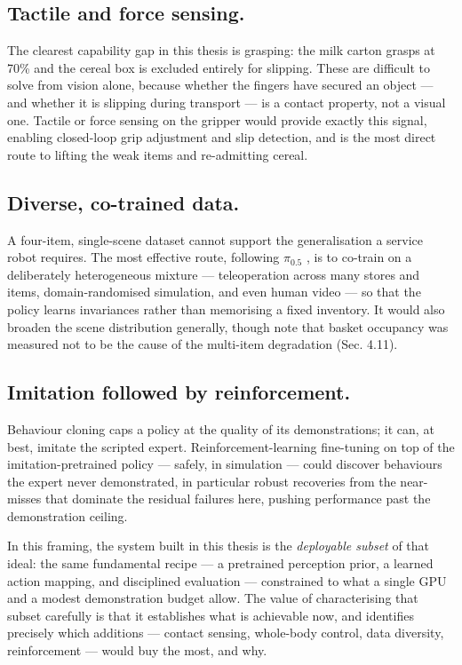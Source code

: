 \subsection{Tactile and force sensing.} The clearest capability gap in this thesis is
grasping: the milk carton grasps at 70\% and the cereal box is excluded entirely for
slipping. These are difficult to solve from vision alone, because whether the fingers
have secured an object --- and whether it is slipping during transport --- is a contact
property, not a visual one. Tactile or force sensing on the gripper would provide
exactly this signal, enabling closed-loop grip adjustment and slip detection, and is
the most direct route to lifting the weak items and re-admitting cereal.

\subsection{Diverse, co-trained data.} A four-item, single-scene dataset cannot
support the generalisation a service robot requires. The most effective route,
following $\pi_{0.5}$ \parencite{black2025pi05}, is to co-train on a deliberately
heterogeneous mixture --- teleoperation across many stores and items, domain-randomised
simulation, and even human video --- so that the policy learns invariances rather than
memorising a fixed inventory. It would also broaden the scene distribution generally, though note that basket occupancy was measured not to be the cause of the multi-item degradation (Sec. 4.11).

\subsection{Imitation followed by reinforcement.} Behaviour cloning caps a policy at
the quality of its demonstrations; it can, at best, imitate the scripted expert.
Reinforcement-learning fine-tuning on top of the imitation-pretrained policy ---
safely, in simulation --- could discover behaviours the expert never demonstrated, in
particular robust recoveries from the near-misses that dominate the residual failures
here, pushing performance past the demonstration ceiling.

In this framing, the system built in this thesis is the \emph{deployable subset} of
that ideal: the same fundamental recipe --- a pretrained perception prior, a learned
action mapping, and disciplined evaluation --- constrained to what a single GPU and a
modest demonstration budget allow. The value of characterising that subset carefully
is that it establishes what is achievable now, and identifies precisely which
additions --- contact sensing, whole-body control, data diversity, reinforcement ---
would buy the most, and why.

